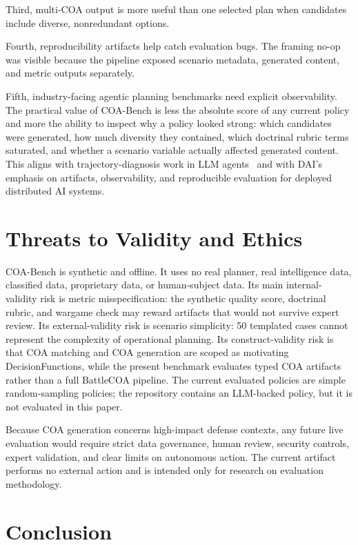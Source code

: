 \documentclass[sigconf]{acmart}
\begin{document}
Third, multi-COA output is more useful than one selected plan when candidates include diverse, nonredundant options.

Fourth, reproducibility artifacts help catch evaluation bugs. The framing no-op was visible because the pipeline exposed scenario metadata, generated content, and metric outputs separately.

Fifth, industry-facing agentic planning benchmarks need explicit observability. The practical value of COA-Bench is less the absolute score of any current policy and more the ability to inspect why a policy looked strong: which candidates were generated, how much diversity they contained, which doctrinal rubric terms saturated, and whether a scenario variable actually affected generated content. This aligns with trajectory-diagnosis work in LLM agents~\cite{ou2025agentdiagnose} and with DAI's emphasis on artifacts, observability, and reproducible evaluation for deployed distributed AI systems.

\section{Threats to Validity and Ethics}

COA-Bench is synthetic and offline. It uses no real planner, real intelligence data, classified data, proprietary data, or human-subject data. Its main internal-validity risk is metric misspecification: the synthetic quality score, doctrinal rubric, and wargame check may reward artifacts that would not survive expert review. Its external-validity risk is scenario simplicity: 50 templated cases cannot represent the complexity of operational planning. Its construct-validity risk is that COA matching and COA generation are scoped as motivating DecisionFunctions, while the present benchmark evaluates typed COA artifacts rather than a full BattleCOA pipeline. The current evaluated policies are simple random-sampling policies; the repository contains an LLM-backed policy, but it is not evaluated in this paper.

Because COA generation concerns high-impact defense contexts, any future live evaluation would require strict data governance, human review, security controls, expert validation, and clear limits on autonomous action. The current artifact performs no external action and is intended only for research on evaluation methodology.

\section{Conclusion}
\end{document}
